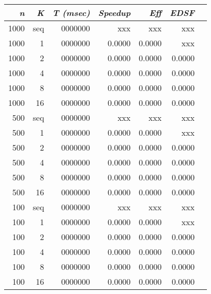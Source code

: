\documentclass{dependencies/acm_proc_article-sp}
\begin{document}
\begin{center}
\begin{tabular}{|r|r|r|r|r|r|r|}\hline
{\em n} & {\em K} & {\em T (msec)} & {\em Speedup} & {\em Eff} & {\em EDSF} \\\hline
1000    & seq     & 0000000        &   xxx         & xxx       & xxx        \\\hline
1000    & 1       & 0000000        & 0.0000        & 0.0000    & xxx        \\\hline
1000    & 2       & 0000000        & 0.0000        & 0.0000    & 0.0000     \\\hline
1000    & 4       & 0000000        & 0.0000        & 0.0000    & 0.0000     \\\hline
1000    & 8       & 0000000        & 0.0000        & 0.0000    & 0.0000     \\\hline
1000    & 16      & 0000000        & 0.0000        & 0.0000    & 0.0000     \\\hline
500     & seq     & 0000000        &   xxx         & xxx       & xxx        \\\hline
500     & 1       & 0000000        & 0.0000        & 0.0000    & xxx        \\\hline
500     & 2       & 0000000        & 0.0000        & 0.0000    & 0.0000     \\\hline
500     & 4       & 0000000        & 0.0000        & 0.0000    & 0.0000     \\\hline
500     & 8       & 0000000        & 0.0000        & 0.0000    & 0.0000     \\\hline
500     & 16      & 0000000        & 0.0000        & 0.0000    & 0.0000     \\\hline
100     & seq     & 0000000        &   xxx         & xxx       & xxx        \\\hline
100     & 1       & 0000000        & 0.0000        & 0.0000    & xxx        \\\hline
100     & 2       & 0000000        & 0.0000        & 0.0000    & 0.0000     \\\hline
100     & 4       & 0000000        & 0.0000        & 0.0000    & 0.0000     \\\hline
100     & 8       & 0000000        & 0.0000        & 0.0000    & 0.0000     \\\hline
100     & 16      & 0000000        & 0.0000        & 0.0000    & 0.0000     \\\hline
\end{tabular}
\end{center}
\end{document}
